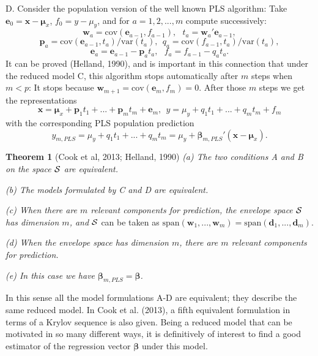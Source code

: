 \documentclass[11pt]{article}
\begin{document}
D. Consider the  population version of the well known PLS algorithm: Take 
$\bm{e}_{0}=\bm{x}-\bm{\mu}_{x}$, $f_{0}=y-\mu_{y}$, and for $a=1,2,...,m$ compute successively: 
\begin{equation} \label{wt}\bm{w}_{a}=\mathrm{cov}(\bm{e}_{a-1}, f_{a-1}),\ \ \  
t_{a}=\bm{w}_{a}'\bm{e}_{a-1},\end{equation}
\begin{equation}\label{pq}\bm{p}_{a}=\mathrm{cov}(\bm{e}_{a-1}, t_{a})/\mathrm{var}(t_{a}),\ \ 
q_{a}=\mathrm{cov}(f_{a-1},t_{a})/\mathrm{var}(t_{a}),\end{equation}
\[\bm{e}_{a}=\bm{e}_{a-1}-\bm{p}_{a}t_{a},\ \ \ 
f_{a}=f_{a-1}-q_{a}t_{a}.\]
 It can be proved (Helland, 1990), and is important in this connection that under the reduced model C, this algorithm stops automatically after $m$ steps when 
 $m<p$: It stops because $\bm{w}_{m+1}=\mathrm{cov}(\bm{e}_{m},f_{m})=0$. After those $m$ steps we get the representations
\begin{equation}\label{latent}\bm{x}=\bm{\mu}_{x}+\bm{p}_{1}t_{1}+...+\bm{p}_{m}t_{m}+\bm{e}_{m},\ \ y=\mu_{y}+q_{1}t_{1}+...+q_{m}t_{m}+ f_{m}\end{equation}
with the corresponding PLS population prediction
\[y_{m,PLS}=\mu_{y}+q_{1}t_{1}+...+q_{m}t_{m}=\mu_{y}+\bm{\beta}_{m,PLS}'(\bm{x}-\bm{\mu}_{x}).\]
\smallskip

\textbf{Theorem 1} (Cook et al, 2013; Helland, 1990) \textit{ (a) The two conditions A and B on the space $\cal{S}$ are equivalent.}

\textit{(b) The models formulated by C and D are equivalent.}

\textit{(c) When there are $m$ relevant components for prediction, the envelope space $\cal{S}$ has dimension $m$, and} 
$\cal{S}$ can be taken as $\mathrm{span}(\bm{w}_{1},...,\bm{w}_{m})=\mathrm{span}(\bm{d}_{1},...,\bm{d}_{m})$.

\textit{(d) When the envelope space has dimension $m$, there are $m$ relevant components for prediction.}

\textit{(e) In this case we have $\bm{\beta}_{m,PLS}=\bm{\beta}$.}
\bigskip

In this sense all the model formulations A-D are equivalent; they describe the same reduced model. In Cook et al. (2013), a fifth equivalent formulation in terms 
of a Krylov sequence is also given. Being a reduced model that can be motivated in so many different ways, it is definitively of interest to find a good 
estimator of the regression vector $\bm{\beta}$ under this model.
\bigskip
\end{document}
